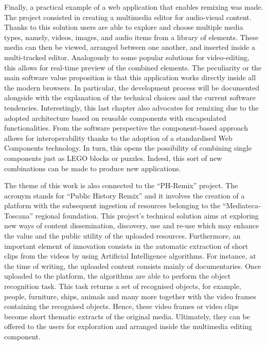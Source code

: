 Finally, a practical example of a web application that enables remixing was made. The project consisted in creating a multimedia editor for audio-visual content. Thanks to this solution users are able to explore and choose multiple media types, namely, videos, images, and audio items from a library of elements. These media can then be viewed, arranged between one another, and inserted inside a multi-tracked editor. Analogously to some popular solutions for video-editing, this allows for real-time preview of the combined elements. The peculiarity or the main software value proposition is that this application works directly inside all the modern browsers.
In particular, the development process will be documented alongside with the explanation of the technical choices and the current software tendencies. Interestingly, this last chapter also advocates for remixing due to the adopted architecture based on reusable components with encapsulated functionalities. From the software perspective the component-based approach allows for interoperability thanks to the adoption of a standardised Web Components technology. In turn, this opens the possibility of combining single components just as LEGO blocks or puzzles. Indeed, this sort of new combinations can be made to produce new applications.

The theme of this work is also connected to the “PH-Remix” project. The acronym stands for “Public History Remix” and it involves the creation of a platform with the subsequent ingestion of resources belonging to the “Mediateca-Toscana” regional foundation. This project’s technical solution aims at exploring new ways of content dissemination, discovery, use and re-use which may enhance the value and the public utility of the uploaded resources. Furthermore, an important element of innovation consists in the automatic extraction of short clips from the videos by using Artificial Intelligence algorithms. For instance, at the time of writing, the uploaded content consists mainly of documentaries. Once uploaded to the platform, the algorithms are able to perform the object recognition task. This task returns a set of recognised objects, for example, people, furniture, ships, animals and many more together with the video frames containing the recognised objects. Hence, these video frames or video clips become short thematic extracts of the original media. Ultimately, they can be offered to the users for exploration and arranged inside the multimedia editing component.

